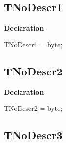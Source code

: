 \documentclass{report}
\newif\ifpdf
\begin{document}
\subsection*{TNoDescr1}
\fi
\label{ok_no_comments_outside_class-TNoDescr1}
\begin{list}{}{
\setlength{\itemindent}{0cm}
\setlength{\listparindent}{0cm}
\setlength{\leftmargin}{\evensidemargin}
\addtolength{\leftmargin}{\tmplength}
\settowidth{\labelsep}{X}
\addtolength{\leftmargin}{\labelsep}
\setlength{\labelwidth}{\tmplength}
}
\item[\textbf{Declaration}\hfill]
\ifpdf
\begin{flushleft}
\fi
\begin{ttfamily}
TNoDescr1 = byte;\end{ttfamily}

\ifpdf
\end{flushleft}
\fi

\end{list}
\ifpdf
\subsection*{\large{\textbf{TNoDescr2}}\normalsize\hspace{1ex}\hrulefill}
\else
\subsection*{TNoDescr2}
\fi
\label{ok_no_comments_outside_class-TNoDescr2}
\begin{list}{}{
\setlength{\itemindent}{0cm}
\setlength{\listparindent}{0cm}
\setlength{\leftmargin}{\evensidemargin}
\addtolength{\leftmargin}{\tmplength}
\settowidth{\labelsep}{X}
\addtolength{\leftmargin}{\labelsep}
\setlength{\labelwidth}{\tmplength}
}
\item[\textbf{Declaration}\hfill]
\ifpdf
\begin{flushleft}
\fi
\begin{ttfamily}
TNoDescr2 = byte;\end{ttfamily}

\ifpdf
\end{flushleft}
\fi

\end{list}
\ifpdf
\subsection*{\large{\textbf{TNoDescr3}}\normalsize\hspace{1ex}\hrulefill}
\else
\end{document}
